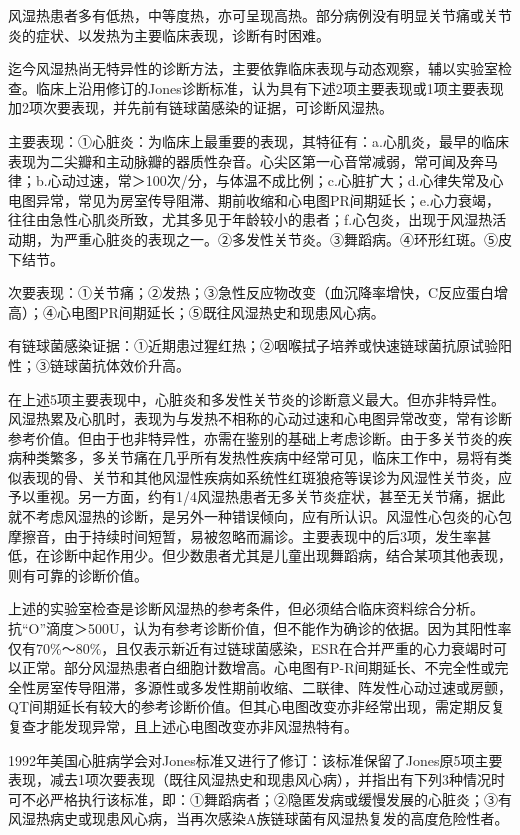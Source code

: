 风湿热患者多有低热，中等度热，亦可呈现高热。部分病例没有明显关节痛或关节炎的症状、以发热为主要临床表现，诊断有时困难。

迄今风湿热尚无特异性的诊断方法，主要依靠临床表现与动态观察，辅以实验室检查。临床上沿用修订的Jones诊断标准，认为具有下述2项主要表现或1项主要表现加2项次要表现，并先前有链球菌感染的证据，可诊断风湿热。

主要表现：①心脏炎：为临床上最重要的表现，其特征有：a.心肌炎，最早的临床表现为二尖瓣和主动脉瓣的器质性杂音。心尖区第一心音常减弱，常可闻及奔马律；b.心动过速，常＞100次/分，与体温不成比例；c.心脏扩大；d.心律失常及心电图异常，常见为房室传导阻滞、期前收缩和心电图PR间期延长；e.心力衰竭，往往由急性心肌炎所致，尤其多见于年龄较小的患者；f.心包炎，出现于风湿热活动期，为严重心脏炎的表现之一。②多发性关节炎。③舞蹈病。④环形红斑。⑤皮下结节。

次要表现：①关节痛；②发热；③急性反应物改变（血沉降率增快，C反应蛋白增高）；④心电图PR间期延长；⑤既往风湿热史和现患风心病。

有链球菌感染证据：①近期患过猩红热；②咽喉拭子培养或快速链球菌抗原试验阳性；③链球菌抗体效价升高。

在上述5项主要表现中，心脏炎和多发性关节炎的诊断意义最大。但亦非特异性。风湿热累及心肌时，表现为与发热不相称的心动过速和心电图异常改变，常有诊断参考价值。但由于也非特异性，亦需在鉴别的基础上考虑诊断。由于多关节炎的疾病种类繁多，多关节痛在几乎所有发热性疾病中经常可见，临床工作中，易将有类似表现的骨、关节和其他风湿性疾病如系统性红斑狼疮等误诊为风湿性关节炎，应予以重视。另一方面，约有1/4风湿热患者无多关节炎症状，甚至无关节痛，据此就不考虑风湿热的诊断，是另外一种错误倾向，应有所认识。风湿性心包炎的心包摩擦音，由于持续时间短暂，易被忽略而漏诊。主要表现中的后3项，发生率甚低，在诊断中起作用少。但少数患者尤其是儿童出现舞蹈病，结合某项其他表现，则有可靠的诊断价值。

上述的实验室检查是诊断风湿热的参考条件，但必须结合临床资料综合分析。抗“O”滴度＞500U，认为有参考诊断价值，但不能作为确诊的依据。因为其阳性率仅有70\%～80\%，且仅表示新近有过链球菌感染，ESR在合并严重的心力衰竭时可以正常。部分风湿热患者白细胞计数增高。心电图有P-R间期延长、不完全性或完全性房室传导阻滞，多源性或多发性期前收缩、二联律、阵发性心动过速或房颤，QT间期延长有较大的参考诊断价值。但其心电图改变亦非经常出现，需定期反复复查才能发现异常，且上述心电图改变亦非风湿热特有。

1992年美国心脏病学会对Jones标准又进行了修订：该标准保留了Jones原5项主要表现，减去1项次要表现（既往风湿热史和现患风心病），并指出有下列3种情况时可不必严格执行该标准，即：①舞蹈病者；②隐匿发病或缓慢发展的心脏炎；③有风湿热病史或现患风心病，当再次感染A族链球菌有风湿热复发的高度危险性者。

